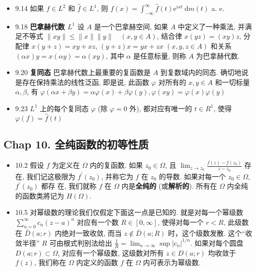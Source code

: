 \begin{itemize}
\item 9.14 如果 $f \in L^{2}$ 和 $\hat{f} \in L^{1}$, 则 $f(x)=\int_{-\infty}^{\infty} \hat{f}(t) \mathrm{e}^{i x t} \mathrm{~d} m(t)$ a. e.

\item 9.18 \textbf{巴拿赫代数 ${L}^{1}$} 设 $A$ 是一个巴拿赫空间, 如果 $A$ 中定义了一种乘法, 并满足不等式 $\|x y\| \leqslant\|x\|\|y\| \quad(x,y \in A)$, 结合律 $x(y z)=(x y) z$, 分配律 $x(y+z)=x y+x z$, $(y+z)x=y x+z x$ $(x, y, z \in A)$ 和关系 $(\alpha x) y=x(\alpha y)=\alpha(x y)$, 其中 $\alpha$ 是任意标量, 则称 $A$ 为巴拿赫代数.

\item 9.20 \textbf{复同态} 巴拿赫代数上最重要的复函数是 $A$ 到复数域内的同态. 确切地说是存在保持乘法的线性泛函, 即是说, 此函数 $\varphi$ 对所有的 $x, y \in A$ 和一切标量 $\alpha, \beta$, 有 $\varphi(\alpha x+\beta y)=\alpha \varphi(x)+\beta \varphi(y), \varphi(x y)=\varphi(x) \varphi(y)$

\item 9.23 $L^{1}$ 上的每个复同态 $\varphi$ (除 $\varphi=0$ 外), 都对应有唯一的 $t \in R^{1}$, 使得 $\varphi(f)=\hat{f}(t)$
\end{itemize}

\subsection{Chap 10. 全纯函数的初等性质}
\begin{itemize}
\item 10.2 假设 $f$ 为定义在 $\Omega$ 内的复函数. 如果 $z_{0} \in \Omega$, 且 $\lim _{z \rightarrow z_{0}} \frac{f(z)-f\left(z_{0}\right)}{z-z_{0}}$ 存在, 我们记这极限为 $f^{\prime}\left(z_{0}\right)$, 并称它为 $f$ 在 $z_{0}$ 的导数. 如果对每一个 $z_{0} \in \Omega$, $f^{\prime}\left(z_{0}\right)$ 都存 在, 我们就称 $f$ 在 $\Omega$ 内是\textbf{全纯的} (或\textbf{解析的}). 所有在 $\Omega$ 内全纯的函数类將记为 $H(\Omega)$.

\item 10.5 对幂级数的理论我们仅假定下面这一点是已知的. 就是对每一个幂级数 $\sum_{n=0}^{\infty} c_{n}(z-a)^{n}$ 对应有一个数 $R \in[0, \infty]$, 使得对每一个 $r<R$, 此级数在 $\bar{D}(a; r)$ 内绝对一致收敛, 而当 $z \notin \bar{D}(a; R)$ 时，这个级数发散. 这个“收敛半径” $R$ 可由根式判别法给出
$\frac{1}{R}=\lim _{n \rightarrow \infty} \sup \left|c_{n}\right|^{1 / n}$. 如果对每个圆盘 $D(a; r) \subset \Omega$, 对应有一个幂级数, 这级数对所有 $z \in D(a; r)$ 均收敛于 $f(z)$, 我们称在 $\Omega$ 内定义的函数 $f$ 在 $\Omega$ 内可表示为幂级数.
\end{itemize}


